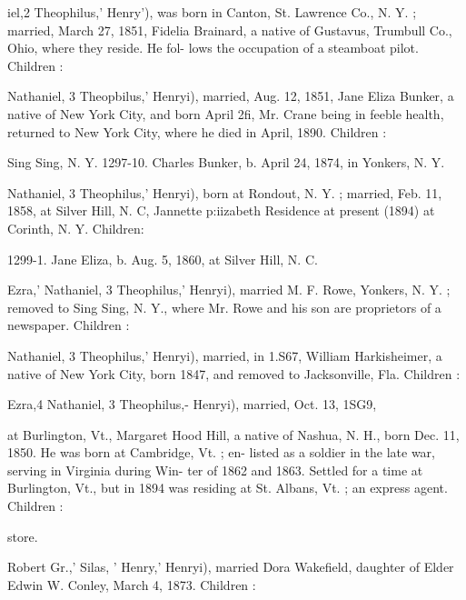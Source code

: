 \documentclass[oneside]{book}
\begin{document}
iel,2 Theophilus,' Henry'), was born in Canton, St. Lawrence 
Co., N. Y. ; married, March 27, 1851, Fidelia Brainard, a native 
of Gustavus, Trumbull Co., Ohio, where they reside. He fol- 
lows the occupation of a steamboat pilot. Children : 





Nathaniel, 3 Theopbilus,' Henryi), married, Aug. 12, 1851, Jane 
Eliza Bunker, a native of New York City, and born April 2fi, 
Mr. Crane being in feeble health, returned to New York City, 
where he died in April, 1890. Children : 



Sing Sing, N. Y. 
1297-10. Charles Bunker, b. April 24, 1874, in Yonkers, N. Y. 

Nathaniel, 3 Theophilus,' Henryi), born at Rondout, N. Y. ; 
married, Feb. 11, 1858, at Silver Hill, N. C, Jannette p:iizabeth 
Residence at present (1894) at Corinth, N. Y. Children: 

1299-1. Jane Eliza, b. Aug. 5, 1860, at Silver Hill, N. C. 










Ezra,' Nathaniel, 3 Theophilus,' Henryi), married M. F. Rowe, 
Yonkers, N. Y. ; removed to Sing Sing, N. Y., where Mr. Rowe 
and his son are proprietors of a newspaper. Children : 



Nathaniel, 3 Theophilus,' Henryi), married, in 1.S67, William 
Harkisheimer, a native of New York City, born 1847, and 
removed to Jacksonville, Fla. Children : 




Ezra,4 Nathaniel, 3 Theophilus,- Henryi), married, Oct. 13, 1SG9, 




at Burlington, Vt., Margaret Hood Hill, a native of Nashua, N. 
H., born Dec. 11, 1850. He was born at Cambridge, Vt. ; en- 
listed as a soldier in the late war, serving in Virginia during Win- 
ter of 1862 and 1863. Settled for a time at Burlington, Vt., but 
in 1894 was residing at St. Albans, Vt. ; an express agent. 
Children : 


store. 

Robert Gr.,' Silas, ' Henry,' Henryi), married Dora Wakefield, 
daughter of Elder Edwin W. Conley, March 4, 1873. Children : 
\end{document}
